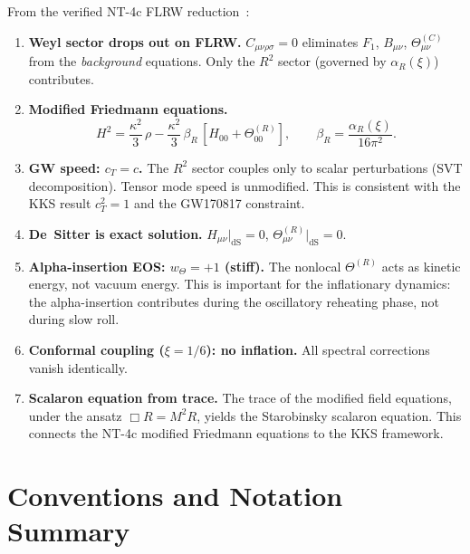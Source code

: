 \documentclass[11pt,a4paper]{article}
\theoremstyle{plain}
\theoremstyle{definition}
\begin{document}
From the verified NT-4c FLRW reduction~\cite{NT4c}:

\begin{enumerate}[(1)]
  \item \textbf{Weyl sector drops out on FLRW.}
    $C_{\mu\nu\rho\sigma} = 0$ eliminates $F_1$, $B_{\mu\nu}$,
    $\Theta^{(C)}_{\mu\nu}$ from the \emph{background} equations.
    Only the $R^2$ sector (governed by $\alpha_R(\xi)$) contributes.

  \item \textbf{Modified Friedmann equations.}
    \begin{equation}\label{eq:friedmann-recap}
      H^2 = \frac{\kappa^2}{3}\,\rho
      - \frac{\kappa^2}{3}\,\beta_R\,
      [H_{00} + \Theta^{(R)}_{00}],
      \qquad
      \beta_R = \frac{\alpha_R(\xi)}{16\pi^2}.
    \end{equation}

  \item \textbf{GW speed: $c_T = c$.}
    The $R^2$ sector couples only to scalar perturbations (SVT
    decomposition). Tensor mode speed is unmodified. This is consistent
    with the KKS result $c_T^2 = 1$ and the GW170817 constraint.

  \item \textbf{De~Sitter is exact solution.}
    $H_{\mu\nu}|_{\mathrm{dS}} = 0$,
    $\Theta^{(R)}_{\mu\nu}|_{\mathrm{dS}} = 0$.

  \item \textbf{Alpha-insertion EOS: $w_\Theta = +1$ (stiff).}
    The nonlocal $\Theta^{(R)}$ acts as kinetic energy, not vacuum
    energy. This is important for the inflationary dynamics: the
    alpha-insertion contributes during the oscillatory reheating phase,
    not during slow roll.

  \item \textbf{Conformal coupling ($\xi = 1/6$): no inflation.}
    All spectral corrections vanish identically.

  \item \textbf{Scalaron equation from trace.}
    The trace of the modified field equations, under the ansatz
    $\Box R = M^2 R$, yields the Starobinsky scalaron equation.
    This connects the NT-4c modified Friedmann equations to the
    KKS framework.
\end{enumerate}

\section{Conventions and Notation Summary}\label{sec:conventions}
\end{document}
